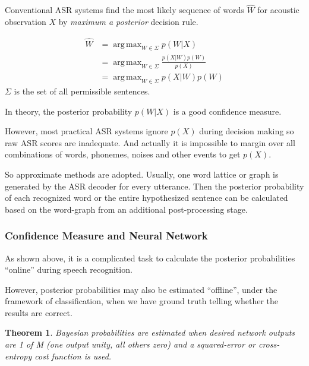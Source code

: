 \documentclass[11pt,a4paper,titlepage]{article}
\DeclareMathOperator*{\argmax}{arg\,max}
\newtheorem*{theorem}{Theorem}
\begin{document}
\medskip

Conventional ASR systems find the most likely sequence of words \(\hat{W}\) for acoustic observation \(X\) by \textit{maximum a posterior} decision rule.

\begin{equation}
  \begin{split}
    \hat{W} & = \argmax_{W \in \Sigma} p(W|X) \\
      & = \argmax_{W \in \Sigma} \frac{p(X|W) p(W)}{p(X)} \\
      & = \argmax_{W \in \Sigma} p(X|W) p(W)
  \end{split}
\end{equation}
\(\Sigma\) is the set of all permissible sentences.

In theory, the posterior probability \(p(W|X)\) is a good confidence measure.

However, most practical ASR systems ignore \(p(X)\) during decision making so raw ASR scores are inadequate.
And actually it is impossible to margin over all combinations of words, phonemes, noises and other events to get \(p(X)\).

So approximate methods are adopted.
Usually, one word lattice or graph is generated by the ASR decoder for every utterance.
Then the posterior probability of each recognized word or the entire hypothesized sentence can be calculated based on the word-graph from an additional post-processing stage.

\subsubsection{Confidence Measure and Neural Network}

As shown above, it is a complicated task to calculate the posterior probabilities \enquote{online} during speech recognition.

However, posterior probabilities may also be estimated \enquote{offline}, under the framework of classification, when we have ground truth telling whether the results are correct.

\bigskip

\begin{mdframed}
\begin{theorem}
  Bayesian probabilities are estimated when desired network outputs are 1 of M (one output unity, all others zero) and a squared-error or cross-entropy cost function is used.
\cite{richard1991neural}
\end{theorem}
\end{mdframed}
\end{document}
